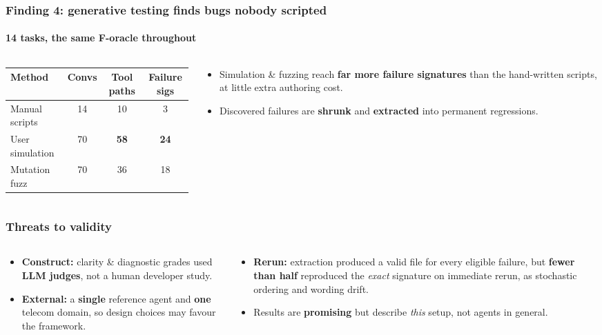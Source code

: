\documentclass[
	aspectratio=169, %
	t,               %
	onlytextwidth,
	10pt,
]{beamer}
\begin{document}
\begin{frame}
	\frametitle{Finding 4: generative testing finds bugs nobody scripted}
	\framesubtitle{14 tasks, the same F-oracle throughout}
	\begin{columns}[c]
		\begin{column}{0.54\linewidth}
			\centering
			\small
			\renewcommand{\arraystretch}{1.3}
			\begin{tabular}{lccc}
			\toprule
			\textbf{Method} & \textbf{Convs} & \textbf{Tool paths} & \textbf{Failure sigs} \\
			\midrule
			Manual scripts   & 14 & 10 & 3 \\
			User simulation  & 70 & \textbf{58} & \textbf{24} \\
			Mutation fuzz    & 70 & 36 & 18 \\
			\bottomrule
			\end{tabular}
		\end{column}
		\begin{column}{0.44\linewidth}
			\begin{itemize}
				\setlength\itemsep{0.8em}
				\item Simulation \& fuzzing reach \textbf{far more failure signatures} than the
				hand-written scripts, at little extra authoring cost.
				\item Discovered failures are \textbf{shrunk} and \textbf{extracted} into permanent
				regressions.
			\end{itemize}
		\end{column}
	\end{columns}
\end{frame}

\begin{frame}
	\frametitle{Threats to validity}
	\begin{columns}[T]
		\begin{column}{0.5\linewidth}
			\begin{itemize}
				\setlength\itemsep{0.6em}
				\item \textbf{Construct:} clarity \& diagnostic grades used \textbf{LLM judges}, not a
				human developer study.
				\item \textbf{External:} a \textbf{single} reference agent and \textbf{one} telecom domain,
				so design choices may favour the framework.
			\end{itemize}
		\end{column}
		\begin{column}{0.5\linewidth}
			\begin{itemize}
				\setlength\itemsep{0.6em}
				\item \textbf{Rerun:} extraction produced a valid file for every eligible failure, but
				\textbf{fewer than half} reproduced the \emph{exact} signature on immediate rerun,
				as stochastic ordering and wording drift.
				\item Results are \textbf{promising} but describe \emph{this} setup, not agents in general.
			\end{itemize}
		\end{column}
	\end{columns}
\end{frame}
\end{document}

